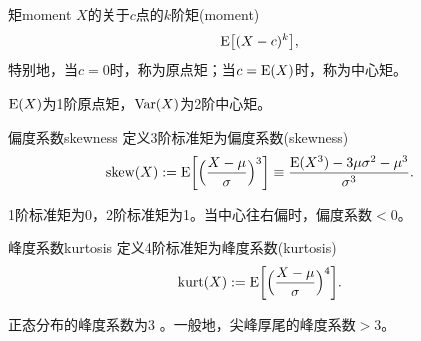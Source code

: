 \begin{definition}{矩}{moment}
	$X$的关于$c$点的$k$阶矩(moment)
	\begin{equation}
		\operatorname{E}\bigl[(X - c)^k\bigr],
	\end{equation}
	特别地，当$c = 0$时，称为原点矩；当$c = \operatorname{E}(X)$时，称为中心矩。
\end{definition}
\begin{remark}
	$\operatorname{E}(X)$为1阶原点矩，$\operatorname{Var}(X)$为2阶中心矩。
\end{remark}
\begin{definition}{偏度系数}{skewness}
	定义3阶标准矩为偏度系数(skewness)
	\begin{equation}
		\label{eqn:skewness}
		\mathrm{skew}(X) := \operatorname{E}\biggl[\Bigl(\frac{X - \mu}\sigma\Bigr)^3\biggr]
		\equiv \frac{\operatorname{E}(X^3) - 3\mu\sigma^2 - \mu^3}{\sigma^3}.
	\end{equation}
\end{definition}
1阶标准矩为0，2阶标准矩为1。当中心往右偏时，偏度系数$< 0$。
\begin{definition}{峰度系数}{kurtosis}
	定义4阶标准矩为峰度系数(kurtosis)
	\begin{equation}
		\mathrm{kurt}(X) := \operatorname{E}\biggl[\Bigl(\frac{X - \mu}\sigma\Bigr)^4\biggr].
	\end{equation}
\end{definition}
正态分布的峰度系数为3%
。一般地，尖峰厚尾的峰度系数$> 3$。
